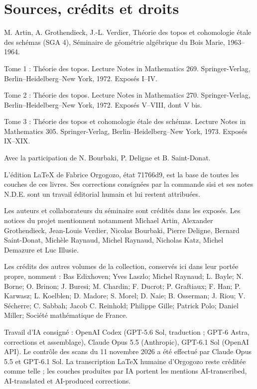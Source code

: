 \chapter*{Sources, crédits et droits}
\begingroup\small
M. Artin, A. Grothendieck, J.-L. Verdier, Théorie des topos et cohomologie étale des schémas (SGA 4), Séminaire de géométrie algébrique du Bois Marie, 1963--1964.\par\medskip
Tome 1 : Théorie des topos. Lecture Notes in Mathematics 269. Springer-Verlag, Berlin--Heidelberg--New York, 1972. Exposés I--IV.\par\medskip
Tome 2 : Théorie des topos. Lecture Notes in Mathematics 270. Springer-Verlag, Berlin--Heidelberg--New York, 1972. Exposés V--VIII, dont V bis.\par\medskip
Tome 3 : Théorie des topos et cohomologie étale des schémas. Lecture Notes in Mathematics 305. Springer-Verlag, Berlin--Heidelberg--New York, 1973. Exposés IX--XIX.\par\medskip
Avec la participation de N. Bourbaki, P. Deligne et B. Saint-Donat.\par\medskip
L'édition LaTeX de Fabrice Orgogozo, état 71766d9, est la base de toutes les couches de ces livres. Ses corrections consignées par la commande sisi et ses notes N.D.E. sont un travail éditorial humain et lui restent attribuées.\par\medskip
Les auteurs et collaborateurs du séminaire sont crédités dans les exposés. Les notices du projet mentionnent notamment Michael Artin, Alexander Grothendieck, Jean-Louis Verdier, Nicolas Bourbaki, Pierre Deligne, Bernard Saint-Donat, Michèle Raynaud, Michel Raynaud, Nicholas Katz, Michel Demazure et Luc Illusie.\par\medskip
Les crédits des autres volumes de la collection, conservés ici dans leur portée propre, nomment : Bas Edixhoven; Yves Laszlo; Michel Raynaud; L. Bayle; N. Borne; O. Brinon; J. Buresi; M. Chardin; F. Ducrot; P. Graftiaux; F. Han; P. Karwasz; L. Koelblen; D. Madore; S. Morel; D. Naie; B. Osserman; J. Riou; V. Sécherre; C. Sabbah; Jacob C. Reinhold; Philippe Gille; Patrick Polo; Daniel Miller; Société mathématique de France.\par\medskip
Travail d'IA consigné : OpenAI Codex (GPT-5.6 Sol, traduction ; GPT-6 Astra, corrections et assemblage), Claude Opus 5.5 (Anthropic), GPT-6.1 Sol (OpenAI API). Le contrôle des scans du 11 novembre 2026 a été effectué par Claude Opus 5.5 et GPT-6.1 Sol. La transcription LaTeX humaine d'Orgogozo reste créditée comme telle ; les couches produites par IA portent les mentions AI-transcribed, AI-translated et AI-produced corrections.\par\medskip
